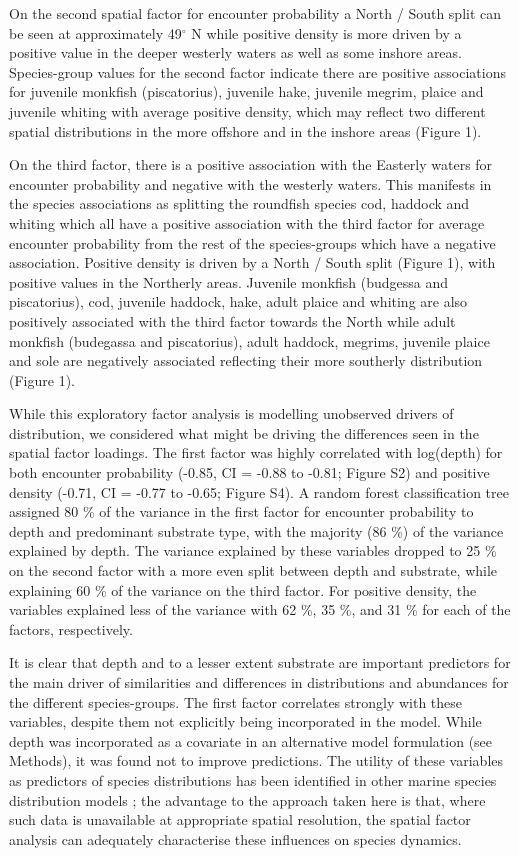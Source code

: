 \documentclass{nature}
\begin{document}
\begin{linenumbers}
On the second spatial factor for encounter probability a North / South split
can be seen at approximately 49$^{\circ}$ N while positive density is more
driven by a positive value in the deeper westerly waters as well as some
inshore areas. Species-group values for the second factor indicate there are
positive associations for juvenile monkfish (piscatorius), juvenile hake,
juvenile megrim, plaice and juvenile whiting with average positive density,
which may reflect two different spatial distributions in the more offshore and
in the inshore areas (Figure 1).

On the third factor, there is a positive association with the Easterly waters
for encounter probability and negative with the westerly waters. This manifests
in the species associations as splitting the roundfish species cod, haddock and
whiting which all have a positive association with the third factor for average
encounter probability from the rest of the species-groups which have a negative
association. Positive density is driven by a North / South split (Figure 1),
with positive values in the Northerly areas. Juvenile monkfish (budgessa and
piscatorius), cod, juvenile haddock, hake, adult plaice and whiting are also
positively associated with the third factor towards the North while adult
monkfish (budegassa and piscatorius), adult haddock, megrims, juvenile plaice
and sole are negatively associated reflecting their more southerly distribution
(Figure 1).

While this exploratory factor analysis is modelling unobserved drivers of
distribution, we considered what might be driving the differences seen in the
spatial factor loadings. The first factor was highly correlated with log(depth)
for both encounter probability (-0.85, CI = -0.88 to -0.81; Figure S2) and
positive density (-0.71, CI = -0.77 to -0.65; Figure S4). A random forest
classification tree assigned 80 \% of the variance in the first factor for
encounter probability to depth and predominant substrate type, with the
majority (86 \%) of the variance explained by depth. The variance explained by
these variables dropped to 25 \% on the second factor with a more even split
between depth and substrate, while explaining 60 \% of the variance on the
third factor.  For positive density, the variables explained less of the
variance with 62 \%, 35 \%, and 31 \% for each of the factors, respectively.

It is clear that depth and to a lesser extent substrate are important
predictors for the main driver of similarities and differences in distributions
and abundances for the different species-groups. The first factor correlates
strongly with these variables, despite them not explicitly being incorporated
in the model. While depth was incorporated as a covariate in an alternative
model formulation (see Methods), it was found not to improve predictions. The
utility of these variables as predictors of species distributions has been
identified in other marine species distribution models \cite{Robinson2011}; the
advantage to the approach taken here is that, where such data is unavailable at
appropriate spatial resolution, the spatial factor analysis can adequately
characterise these influences on species dynamics.


\end{linenumbers}
\end{document}
